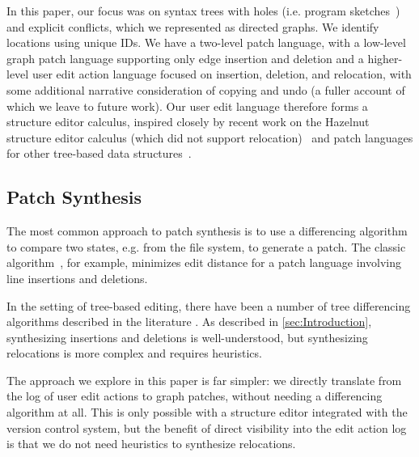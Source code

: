 In this paper, our focus was on syntax trees with holes (i.e. program sketches~\cite{DBLP:conf/aplas/Solar-Lezama09, DBLP:conf/popl/OmarVHAH17}) and explicit conflicts, which we represented as directed graphs. We identify locations using unique IDs. We have a two-level patch language, with a low-level graph patch language supporting only edge insertion and deletion and a higher-level user edit action language focused on insertion, deletion, and relocation, with some additional narrative consideration of copying and undo (a fuller account of which we leave to future work).  Our user edit language therefore forms a structure editor calculus, inspired closely by recent work on the Hazelnut structure editor calculus (which did not support relocation)~\cite{DBLP:conf/popl/OmarVHAH17} and patch languages for other tree-based data structures~\cite{DBLP:conf/sigmod/ChawatheG97, DBLP:journals/tse/FluriWPG07,DBLP:conf/kbse/FalleriMBMM14,DBLP:conf/doceng/Lindholm04,DBLP:conf/fase/NguyenNPN10,DBLP:journals/scp/SchwagerlUW15}.

\subsection{Patch Synthesis}
The most common approach to patch synthesis is to use a differencing algorithm to compare two states, e.g. from the file system, to generate a patch. 
The classic  algorithm~\cite{DiffAlgorithm}, for example, minimizes edit distance for a patch language involving line insertions and deletions.

In the setting of tree-based editing, there have been a number of tree differencing algorithms described in the literature \cite{DBLP:conf/esa/Klein98,DBLP:journals/tcs/Bille05,DBLP:journals/talg/DemaineMRW09,DBLP:journals/fuin/AratsuHK10,DBLP:conf/sigmod/ChawatheG97, DBLP:journals/tse/FluriWPG07,DBLP:conf/kbse/FalleriMBMM14,DBLP:conf/doceng/Lindholm04,DBLP:conf/fase/NguyenNPN10,DBLP:journals/scp/SchwagerlUW15}. 
As described in \autoref{sec:Introduction}, synthesizing insertions and deletions is well-understood, but synthesizing relocations is more complex and requires heuristics.

The approach we explore in this paper is far simpler: we directly translate from the log of user edit actions to graph patches, without needing a differencing algorithm at all. This is only possible with a structure editor integrated with the version control system, but the benefit of direct visibility into the edit action log is that we do not need heuristics to synthesize relocations.

